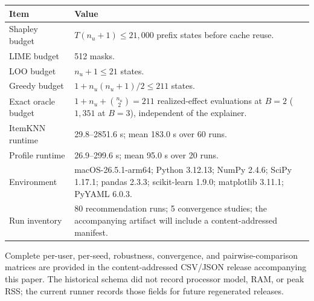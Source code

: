 \begin{center}
\scriptsize
{}
\label{tab:app-computation}
\begin{tabular}{@{}p{}p{}@{}}
\toprule
Item & Value \\
\midrule
Shapley budget & $T(n_u+1)\le21{,}000$ prefix states before cache reuse. \\
LIME budget & 512 masks. \\
LOO budget & $n_u+1\le21$ states. \\
Greedy budget & $1+n_u(n_u+1)/2\le211$ states. \\
Exact oracle budget & $1+n_u+\binom{n_u}{2}=211$ realized-effect evaluations at $B=2$ ($1{,}351$ at $B=3$), independent of the explainer. \\
ItemKNN runtime & 29.8--2851.6 s; mean 183.0 s over 60 runs. \\
Profile runtime & 26.9--299.6 s; mean 95.0 s over 20 runs. \\
Environment & macOS-26.5.1-arm64; Python 3.12.13; NumPy 2.4.6; SciPy 1.17.1; pandas 2.3.3; scikit-learn 1.9.0; matplotlib 3.11.1; PyYAML 6.0.3. \\
Run inventory & 80 recommendation runs; 5 convergence studies; the accompanying artifact will include a content-addressed manifest. \\
\bottomrule
\end{tabular}
\end{center}

\noindent Complete per-user, per-seed, robustness, convergence, and pairwise-comparison matrices are provided in the content-addressed CSV/JSON release accompanying this paper. The historical schema did not record processor model, RAM, or peak RSS; the current runner records those fields for future regenerated releases.


